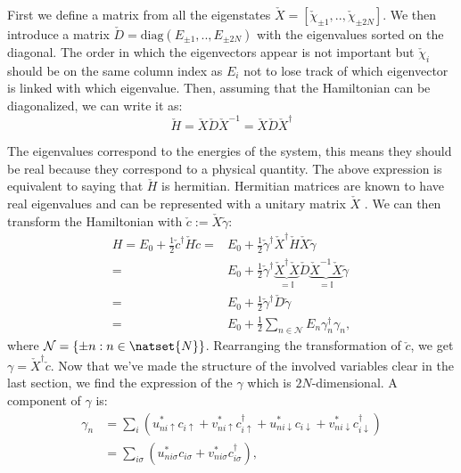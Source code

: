 \documentclass[../main.tex]{subfile}
\begin{document}
First we define a matrix from all the eigenstates $\check{X} = [\check{\chi}_{\pm 1},..,\check{\chi}_{\pm 2N}]$.
We then introduce a matrix $\check{D} = \text{diag}(E_{\pm 1},..,E_{\pm 2N})$ with the eigenvalues sorted on the diagonal. The order in which the eigenvectors appear is not important
but $\check{\chi}_{i}$ should be on the same column index as $E_{i}$ not to lose track of which eigenvector is linked with which eigenvalue.
Then, assuming that the Hamiltonian can be diagonalized, we can write it as:
\begin{equation}\label{eq:Diag_Ham}
    \check{H} = \check{X}\check{D}\check{X}^{-1} = \check{X}\check{D}\check{X}^{\dagger} 
\end{equation}

The eigenvalues correspond to the energies of the system, this means they should be real because they correspond to a physical quantity. The above expression
is equivalent to saying that $\check{H}$ is hermitian. Hermitian matrices are known to have real eigenvalues and can be represented with a unitary matrix $\check{X}$ \cite{Terence}.
We can then transform the Hamiltonian with $\check{c} := \check{X}\check{\gamma}$:
\begin{align*}
    H = E_0 + \frac{1}{2}\check{c}^{\dagger}\check{H}\check{c} =& E_0 + \frac{1}{2}\check{\gamma}^{\dagger}\check{X}^{\dagger}\check{H}\check{X}\check{\gamma}\\
    =& E_0 +\frac{1}{2}\check{\gamma}^{\dagger}\underbrace{\check{X}^{\dagger} \check{X}}_{=\mathbb{I}}\check{D}\underbrace{\check{X}^{-1}\check{X}}_{=\mathbb{I}}\check{\gamma}\\
    =& E_0 + \frac{1}{2}\check{\gamma}^{\dagger}\check{D}\check{\gamma}\\
    =& E_0 + \frac{1}{2}\sum_{n\in\mathcal{N}}E_n \gamma_n^{\dagger}\gamma_n,
\end{align*}
where $\mathcal{N}= \{\pm n : n \in \natset{N}\}$.
Rearranging the transformation of $\check{c}$, we get $\gamma = \check{X}^{\dagger}\check{c}$.   
Now that we've made the structure of the involved variables clear in the last section, we find the expression of the $\gamma$ which is $2N$-dimensional. A component of $\gamma$ is:
\begin{align*}
    \gamma_n &= \sum_{i} \left( u_{ni\uparrow}^{\ast}c_{i\uparrow}+ v_{ni\uparrow}^{\ast}c_{i\uparrow}^{\dagger} +  u_{ni\downarrow}^{\ast}c_{i\downarrow}+ v_{ni\downarrow}^{\ast}c_{i\downarrow}^{\dagger}\right)\\
        &=  \sum_{i\sigma} \left( u_{ni\sigma}^{\ast}c_{i\sigma}+ v_{ni\sigma}^{\ast}c_{i\sigma}^{\dagger}\right),
\end{align*}
\end{document}
